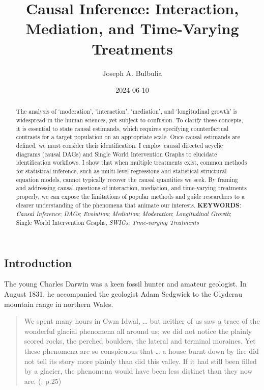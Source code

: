 \documentclass[
  single column]{article}
\title{Causal Inference: Interaction, Mediation, and Time-Varying
Treatments}
\author{Joseph A. Bulbulia}
\affil{%
             \small{     Victoria University of Wellington, New Zealand
          ORCID \textcolor[HTML]{A6CE39}{\aiOrcid} ~0000-0002-5861-2056 }
              }
\date{2024-06-10}
\begin{document}
\maketitle
\begin{abstract}
The analysis of `moderation', `interaction', `mediation', and
`longitudinal growth' is widespread in the human sciences, yet subject
to confusion. To clarify these concepts, it is essential to state causal
estimands, which requires specifying counterfactual contrasts for a
target population on an appropriate scale. Once causal estimands are
defined, we must consider their identification. I employ causal directed
acyclic diagrams (causal DAGs) and Single World Intervention Graphs to
elucidate identification workflows. I show that when multiple treatments
exist, common methods for statistical inference, such as multi-level
regressions and statistical structural equation models, cannot typically
recover the causal quantities we seek. By framing and addressing causal
questions of interaction, mediation, and time-varying treatments
properly, we can expose the limitations of popular methods and guide
researchers to a clearer understanding of the phenomena that animate our
interests. \textbf{KEYWORDS}: \emph{Causal Inference}; \emph{DAGs};
\emph{Evolution}; \emph{Mediation}; \emph{Moderation};
\emph{Longitudinal Growth}; Single World Intervention Graphs,
\emph{SWIGs}; \emph{Time-varying Treatments}
\end{abstract}

\subsection{Introduction}\label{id-introduction}

The young Charles Darwin was a keen fossil hunter and amateur geologist.
In August 1831, he accompanied the geologist Adam Sedgwick to the
Glyderau mountain range in northern Wales.

\begin{quote}
We spent many hours in Cwm Idwal, \ldots{} but neither of us saw a trace
of the wonderful glacial phenomena all around us; we did not notice the
plainly scored rocks, the perched boulders, the lateral and terminal
moraines. Yet these phenomena are so conspicuous that \ldots{} a house
burnt down by fire did not tell its story more plainly than did this
valley. If it had still been filled by a glacier, the phenomena would
have been less distinct than they now are.
(: p.25)
\end{quote}
\end{document}
